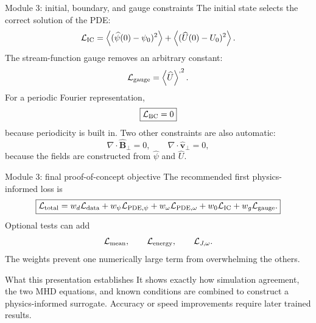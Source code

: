 \documentclass[aspectratio=169,11pt]{beamer}
\newcommand{\avg}[1]{\left\langle #1\right\rangle}
\newcommand{\vect}[1]{\bm{#1}}
\newcommand{\currentmodule}{Module 1}
\newcommand{\moduleprogress}{1 of 4}
\newcommand{\setmodule}[2]{%
  \renewcommand{\currentmodule}{#1}%
  \renewcommand{\moduleprogress}{#2}%
}
\begin{document}
\setmodule{Module 3}{4 of 5}
\begin{frame}[t]{Module 3: initial, boundary, and gauge constraints}
\vspace{-0.15em}
The initial state selects the correct solution of the PDE:
\[
\mathcal L_{\rm IC}
=\avg{(\widehat\psi(0)-\psi_0)^2}
+\avg{(\widehat U(0)-U_0)^2}.
\]
The stream-function gauge removes an arbitrary constant:
\[
\mathcal L_{\rm gauge}=\avg{\widehat U}^{,2}.
\]
For a periodic Fourier representation,
\[
\boxed{\mathcal L_{\rm BC}=0}
\]
because periodicity is built in. Two other constraints are also automatic:
\[
\nabla\cdot\widehat{\vect B}_\perp=0,
\qquad
\nabla\cdot\widehat{\vect v}_\perp=0,
\]
because the fields are constructed from $\widehat\psi$ and $\widehat U$.
\end{frame}

\setmodule{Module 3}{5 of 5}
\begin{frame}[t]{Module 3: final proof-of-concept objective}
\vspace{-0.15em}
The recommended first physics-informed loss is
\[
\boxed{
\mathcal L_{\rm total}
=w_d\mathcal L_{\rm data}
+w_\psi\mathcal L_{{\rm PDE},\psi}
+w_\omega\mathcal L_{{\rm PDE},\omega}
+w_0\mathcal L_{\rm IC}
+w_g\mathcal L_{\rm gauge}.
}
\]
Optional tests can add
\[
\mathcal L_{\rm mean},\qquad
\mathcal L_{\rm energy},\qquad
\mathcal L_{J,\omega}.
\]
The weights prevent one numerically large term from overwhelming the others.

\begin{exampleblock}{What this presentation establishes}
It shows exactly how simulation agreement, the two MHD equations, and known conditions are combined to construct a physics-informed surrogate. Accuracy or speed improvements require later trained results.
\end{exampleblock}
\end{frame}
\end{document}
